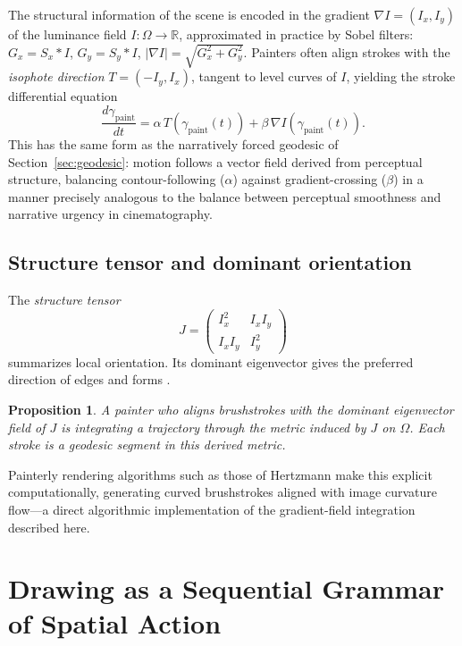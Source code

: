 \documentclass[12pt,a4paper]{article}
\theoremstyle{plain}
\newtheorem{proposition}[theorem]{Proposition}
\theoremstyle{definition}
\begin{document}
The structural information of the scene is encoded in the gradient
$\nabla I = (I_x,I_y)$ of the luminance field $I:\Omega\to\mathbb{R}$,
approximated in practice by Sobel filters:
$G_x = S_x*I$, $G_y = S_y*I$, $|\nabla I|=\sqrt{G_x^2+G_y^2}$.
Painters often align strokes with the \emph{isophote direction}
$T = (-I_y,I_x)$, tangent to level curves of $I$, yielding the stroke
differential equation
\[
\frac{d\gamma_{\text{paint}}}{dt}
= \alpha\,T(\gamma_{\text{paint}}(t))
+ \beta\,\nabla I(\gamma_{\text{paint}}(t)).
\]
This has the same form as the narratively forced geodesic of
Section~\ref{sec:geodesic}: motion follows a vector field derived from
perceptual structure, balancing contour-following ($\alpha$) against
gradient-crossing ($\beta$) in a manner precisely analogous to the balance
between perceptual smoothness and narrative urgency in cinematography.

\subsection{Structure tensor and dominant orientation}

The \emph{structure tensor}
\[
J = \begin{pmatrix} I_x^2 & I_xI_y \\ I_xI_y & I_y^2 \end{pmatrix}
\]
summarizes local orientation. Its dominant eigenvector gives the preferred
direction of edges and forms \cite{perona1990,hertzmann1998}.

\begin{proposition}
A painter who aligns brushstrokes with the dominant eigenvector field of $J$
is integrating a trajectory through the metric induced by $J$ on $\Omega$.
Each stroke is a geodesic segment in this derived metric.
\end{proposition}

Painterly rendering algorithms such as those of Hertzmann \cite{hertzmann1998}
make this explicit computationally, generating curved brushstrokes aligned with
image curvature flow---a direct algorithmic implementation of the gradient-field
integration described here.

\section{Drawing as a Sequential Grammar of Spatial Action}
\label{sec:drawing}
\end{document}
